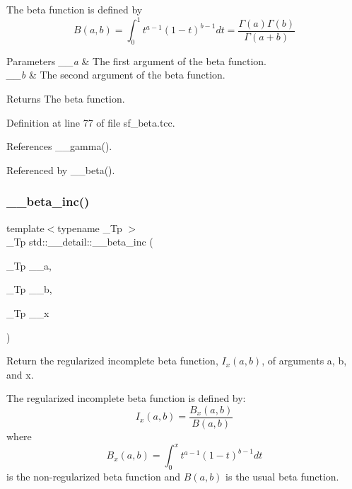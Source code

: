 The beta function is defined by \[ B(a,b) = \int_0^1 t^{a - 1} (1 - t)^{b - 1} dt = \frac{\Gamma(a)\Gamma(b)}{\Gamma(a+b)} \]


\begin{DoxyParams}{Parameters}
{\em \+\_\+\+\_\+a} & The first argument of the beta function. \\
\hline
{\em \+\_\+\+\_\+b} & The second argument of the beta function. \\
\hline
\end{DoxyParams}
\begin{DoxyReturn}{Returns}
The beta function. 
\end{DoxyReturn}


Definition at line 77 of file sf\+\_\+beta.\+tcc.



References \+\_\+\+\_\+gamma().



Referenced by \+\_\+\+\_\+beta().

\mbox{\label{namespacestd_1_1____detail_aedfe43a9c0065cc3883df50536a625e4}} 
\subsubsection{\texorpdfstring{\+\_\+\+\_\+beta\+\_\+inc()}{\_\_beta\_inc()}}
{\footnotesize\ttfamily template$<$typename \+\_\+\+Tp $>$ \\
\+\_\+\+Tp std\+::\+\_\+\+\_\+detail\+::\+\_\+\+\_\+beta\+\_\+inc (\begin{DoxyParamCaption}\item[{\+\_\+\+Tp}]{\+\_\+\+\_\+a,  }\item[{\+\_\+\+Tp}]{\+\_\+\+\_\+b,  }\item[{\+\_\+\+Tp}]{\+\_\+\+\_\+x }\end{DoxyParamCaption})}

Return the regularized incomplete beta function, $ I_x(a,b) $, of arguments {\ttfamily a}, {\ttfamily b}, and {\ttfamily x}.

The regularized incomplete beta function is defined by\+: \[ I_x(a,b) = \frac{B_x(a,b)}{B(a,b)} \] where \[ B_x(a,b) = \int_0^x t^{a - 1} (1 - t)^{b - 1} dt \] is the non-\/regularized beta function and $ B(a,b) $ is the usual beta function.


